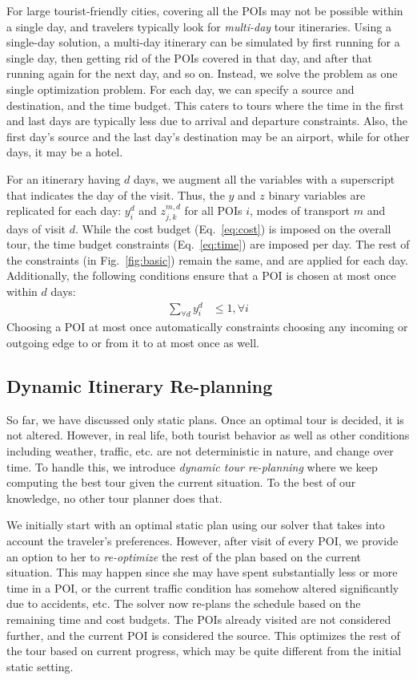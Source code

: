 For large tourist-friendly cities, covering all the POIs may not be
possible within a single day, and travelers typically look for
\emph{multi-day} tour itineraries.
Using a single-day solution, a multi-day itinerary can be simulated
by first
running for a single day, then getting rid of the POIs covered in that day, and
after that running again for the next day, and so on.
Instead, we solve the
problem as one single optimization problem.  For each day, we can specify a
source and destination, and the time budget.  This caters to tours where
the time in the first and last days are typically less due to arrival and
departure constraints.  Also, the first day's source and the last day's
destination may be an airport, while for other days, it
may be a hotel.

For an itinerary having $d$ days, we augment all the variables with a
superscript that indicates the day of the visit.  Thus, the $y$ and $z$
binary variables are replicated for each day: $y^d_i$ and $z^{m,d}_{j,k}$
for all POIs $i$, modes of transport $m$ and days of visit $d$.  While the
cost budget (Eq.~\eqref{eq:cost}) is imposed on the overall tour, the time
budget constraints (Eq.~\eqref{eq:time}) are imposed per day.  The rest of
the constraints (in Fig.~\ref{fig:basic})
remain the same, and are applied for each day.  Additionally, the following
conditions ensure that a POI is chosen at most once within $d$ days:
%
\begin{align}
	\label{eq:multiday}
	\sum_{\forall d} y^d_i & \leq 1, \forall i
\end{align}
%
Choosing a POI at most once automatically constraints choosing any incoming
or outgoing edge to or from it to at most once as well.

\subsection{Dynamic Itinerary Re-planning}
\label{sec:dynamic}

So far, we have discussed only static plans.
Once an optimal tour is decided, it is not altered.
However, in real life, both tourist behavior as well as other conditions including weather, traffic, etc. are not deterministic in nature, and change over time.
To handle this, we introduce \emph{dynamic tour re-planning} where we keep computing the best tour given the current situation.
To the best of our knowledge, no other tour planner does that.

We initially start with an optimal static plan using our solver that takes into account the traveler's preferences.
However, after visit of every POI, we provide an option to her to \emph{re-optimize} the rest of the plan based on the current situation.
This may happen since she may have spent substantially less or more time in a POI, or the current traffic condition has somehow altered significantly due to accidents, etc.
%
The \trip solver now re-plans the schedule based on the remaining time and cost
budgets. The POIs already visited are not considered further, and the current POI is considered the source.
This optimizes the rest of the tour based on current progress, which may be quite different from the initial
static setting.

